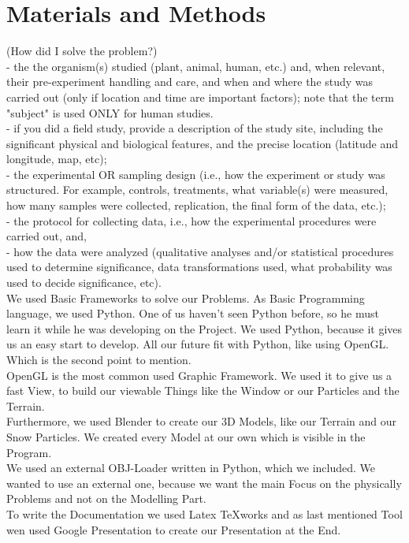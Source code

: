 \documentclass{sig-alternate-05-2015}
\begin{document}
\section {Materials and Methods}
(How did I solve the problem?)\\
- the the organism(s) studied (plant, animal, human, etc.) and, when relevant, their pre-experiment handling and care, and when and where the study was carried out (only if location and time are important factors); note that the term "subject" is used ONLY for human studies.\\
- if you did a field study, provide a description of the study site, including the significant physical and biological features, and the precise location (latitude and longitude, map, etc);\\
- the experimental OR sampling design (i.e., how the experiment or study was structured. For example, controls, treatments, what variable(s) were measured, how many samples were collected, replication, the final form of the data, etc.);\\
- the protocol for collecting data, i.e., how the experimental procedures were carried out, and,\\
- how the data were analyzed (qualitative analyses and/or statistical procedures used to determine significance, data transformations used, what probability was used to decide significance, etc).\\

We used Basic Frameworks to solve our Problems. As Basic Programming language, we used Python. One of us haven't seen Python before, so he must learn it while he was developing on the Project. We used Python, because it gives us an easy start to develop. All our future fit with Python, like using OpenGL. Which is the second point to mention.\\
OpenGL is the most common used Graphic Framework. We used it to give us a fast View, to build our viewable Things like the Window or our Particles and the Terrain. \\
Furthermore, we used Blender to create our 3D Models, like our Terrain and our Snow Particles. We created every Model at our own which is visible in the Program. \\
We used an external OBJ-Loader written in Python, which we included. We wanted to use an external one, because we want the main Focus on the physically Problems and not on the Modelling Part. \\
To write the Documentation we used Latex TeXworks and as last mentioned Tool wen used Google Presentation to create our Presentation at the End. 
\\
\\
\end{document}
